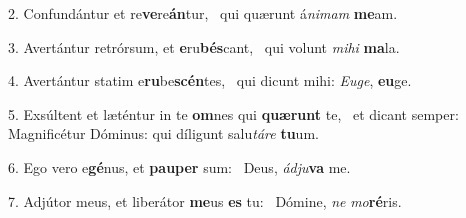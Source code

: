 2. Confundántur et re\textbf{ve}re\textbf{án}tur, \ast\  qui quærunt á\textit{ni}\textit{mam} \textbf{me}am.\

3. Avertántur retrórsum, et \textbf{e}ru\textbf{bés}cant, \ast\  qui volunt \textit{mi}\textit{hi} \textbf{ma}la.\

4. Avertántur statim e\textbf{ru}be\textbf{scén}tes, \ast\  qui dicunt mihi: \textit{Eu}\textit{ge}, \textbf{eu}ge.\

5. Exsúltent et læténtur in te \textbf{om}nes qui \textbf{quæ}\textbf{runt} te, \ast\  et dicant semper: Magnificétur Dóminus: qui díligunt salu\textit{tá}\textit{re} \textbf{tu}um.\

6. Ego vero e\textbf{gé}nus, et \textbf{pau}\textbf{per} sum: \ast\  Deus, \textit{ád}\textit{ju}\textbf{va} me.\

7. Adjútor meus, et liberátor \textbf{me}us \textbf{es} tu: \ast\  Dómine, \textit{ne} \textit{mo}\textbf{ré}ris.\

